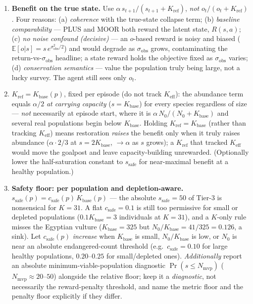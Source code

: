 \documentclass[11pt]{article}
\newcommand{\Keff}{K_{\mathrm{eff}}}
\newcommand{\Kbase}{K_{\mathrm{base}}}
\newcommand{\Kref}{K_{\mathrm{ref}}}
\newcommand{\sobs}{\sigma_{\mathrm{obs}}}
\newcommand{\ssafe}{s_{\mathrm{safe}}}
\begin{document}
\begin{enumerate}[leftmargin=1.8em,nosep]
\item \textbf{Benefit on the true state.} Use $\alpha\,s_{t+1}/(s_{t+1}+\Kref)$, \emph{not}
$o_t/(o_t+\Kref)$. Four reasons: (a) \emph{coherence} with the true-state collapse term;
(b) \emph{baseline comparability} --- PLUS \cite{plus2018} and MOOR \cite{moor2025} both
reward the latent state, $R(s,a)$; (c) \emph{no noise confound (decisive)} --- an
$o$-based reward is noisy and biased ($\mathbb{E}[o|s]{=}s\,e^{\sobs^2/2}$) and would
degrade as $\sobs$ grows, contaminating the return-vs-$\sobs$ headline; a state reward
holds the objective fixed as $\sobs$ varies; (d) \emph{conservation semantics} --- value
the population truly being large, not a lucky survey. The agent still sees only $o_t$.
\item $\Kref{=}\Kbase(p)$, fixed per episode (do not track $\Keff$): the abundance
term equals $\alpha/2$ \emph{at carrying capacity} ($s{=}\Kbase$) for every species
regardless of size --- \emph{not} necessarily at episode start, where it is
$\alpha\,N_0/(N_0{+}\Kbase)$ and several real populations begin below $\Kbase$. Holding
$\Kref{=}\Kbase$ (rather than tracking $\Keff$) means restoration \emph{raises} the
benefit only when it truly raises abundance ($\alpha\cdot2/3$ at $s{=}2\Kbase$,
$\to\alpha$ as $s$ grows); a $\Kref$ that tracked $\Keff$ would move the goalpost and
leave capacity-building unrewarded. (Optionally lower the half-saturation constant to
$\ssafe$ for near-maximal benefit at a healthy population.)
\item \textbf{Safety floor: per population and depletion-aware.}
$\ssafe(p)=c_{\mathrm{safe}}(p)\,\Kbase(p)$ --- the absolute $\ssafe{=}50$ of Tier-3 is
nonsensical for $K{=}31$. A flat $c_{\mathrm{safe}}{=}0.1$ is still too permissive for
small or depleted populations ($0.1\Kbase{=}3$ individuals at $K{=}31$), and a
$K$-only rule misses the Egyptian vulture ($\Kbase{=}325$ but
$N_0/\Kbase{=}41/325{=}0.126$, a sink). Let $c_{\mathrm{safe}}(p)$ \emph{increase} when
$\Kbase$ is small, $N_0/\Kbase$ is low, or $N_0$ is near an absolute endangered-count
threshold (e.g.\ $c_{\mathrm{safe}}{=}0.10$ for large healthy populations,
$0.20$--$0.25$ for small/depleted ones). \emph{Additionally} report an absolute
minimum-viable-population diagnostic $\Pr(s\le N_{\mathrm{mvp}})$
($N_{\mathrm{mvp}}\!\approx\!20$--$50$) alongside the relative floor; keep it a
\emph{diagnostic}, not necessarily the reward-penalty threshold, and name the metric
floor and the penalty floor explicitly if they differ.

\end{enumerate}
\end{document}
